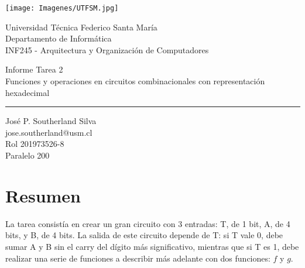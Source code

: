 \documentclass[a4paper,11pt]{article}
\begin{document}

\thispagestyle{empty} %

  \begin{minipage}{.2\linewidth}
    \begin{flushleft}
      \texttt{[image: Imagenes/UTFSM.jpg]}
    \end{flushleft} 
  \end{minipage}
  \hfill
  \begin{minipage}{.7\linewidth}
    \begin{flushright}
        Universidad Técnica Federico Santa María \\
        Departamento de Informática\\
        INF245 - Arquitectura y Organización de Computadores\\
    \end{flushright}
  \end{minipage}

\vfill %
\begin{center}
	{\Large Informe Tarea 2\\}
	{\huge Funciones y operaciones en circuitos combinacionales con representación hexadecimal\\}
	\vspace{.5cm}
	\hrule
	\vspace{.5cm}
	{\large José P. Southerland Silva}\\
	jose.southerland@usm.cl\\
	Rol 201973526-8\\
	Paralelo 200\\
	
\end{center}
\vfill
\newpage

\section{Resumen}
La tarea consistía en crear un gran circuito con 3 entradas: T, de 1 bit, A, de 4 bits, y B, de 4 bits. La salida de este circuito depende de T: si T vale 0, debe sumar A y B sin el carry del dígito más significativo, mientras que si T es 1, debe realizar una serie de funciones a describir más adelante con dos funciones: $f$ y $g$.\\
\end{document}
